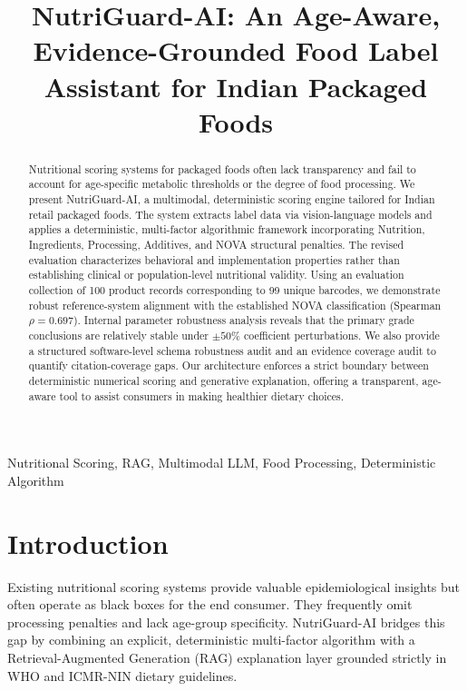 \documentclass[conference]{IEEEtran}
\begin{document}
\title{NutriGuard-AI: An Age-Aware, Evidence-Grounded Food Label Assistant for Indian Packaged Foods}

\author{
}

\maketitle

\begin{abstract}
Nutritional scoring systems for packaged foods often lack transparency and fail to account for age-specific metabolic thresholds or the degree of food processing. We present NutriGuard-AI, a multimodal, deterministic scoring engine tailored for Indian retail packaged foods. The system extracts label data via vision-language models and applies a deterministic, multi-factor algorithmic framework incorporating Nutrition, Ingredients, Processing, Additives, and NOVA structural penalties. The revised evaluation characterizes behavioral and implementation properties rather than establishing clinical or population-level nutritional validity. Using an evaluation collection of 100 product records corresponding to 99 unique barcodes, we demonstrate robust reference-system alignment with the established NOVA classification (Spearman $\rho = 0.697$). Internal parameter robustness analysis reveals that the primary grade conclusions are relatively stable under $\pm 50\%$ coefficient perturbations. We also provide a structured software-level schema robustness audit and an evidence coverage audit to quantify citation-coverage gaps. Our architecture enforces a strict boundary between deterministic numerical scoring and generative explanation, offering a transparent, age-aware tool to assist consumers in making healthier dietary choices.
\end{abstract}

\begin{IEEEkeywords}
Nutritional Scoring, RAG, Multimodal LLM, Food Processing, Deterministic Algorithm
\end{IEEEkeywords}

\section{Introduction}
Existing nutritional scoring systems provide valuable epidemiological insights but often operate as black boxes for the end consumer. They frequently omit processing penalties and lack age-group specificity. NutriGuard-AI bridges this gap by combining an explicit, deterministic multi-factor algorithm with a Retrieval-Augmented Generation (RAG) explanation layer grounded strictly in WHO and ICMR-NIN dietary guidelines. 
\end{document}
